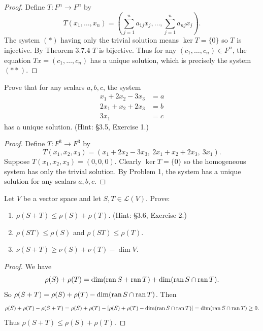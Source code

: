 \begin{proof}
    Define $T : F^n \to F^n$ by 
    \[T(x_1, \ldots, x_n) = \left(\sum_{j=1}^n a_{1j}x_j, \ldots, \sum_{j=1}^n a_{nj}x_j\right).\]
    The system $(*)$ having only the trivial solution means $\ker T = \{0\}$
        so $T$ is injective. 
    By Theorem 3.7.4 $T$ is bijective.
    Thus for any $(c_1, \ldots, c_n) \in F^n$, the equation $Tx = (c_1, \ldots, c_n)$ 
        has a unique solution, which is precisely the system $(**)$.
\end{proof}

\begin{tcolorbox}[title=Problem 2, breakable]
    Prove that for any scalars $a, b, c$, the system
    \begin{align*}
        x_1 + 2x_2 - 3x_3 &= a \\
        2x_1 + x_2 + 2x_3 &= b \\
        3x_1 \phantom{{}+ x_2} \phantom{{}- 3x_3} &= c
    \end{align*}
    has a unique solution. (Hint: \S 3.5, Exercise 1.)
\end{tcolorbox}

\begin{proof}
    Define $T : F^3 \to F^3$ by 
    \[T(x_1, x_2, x_3) = (x_1 + 2x_2 - 3x_3, \ 2x_1 + x_2 + 2x_3, \ 3x_1).\]
    Suppose $T(x_1, x_2, x_3) = (0, 0, 0)$. 
    Clearly $\ker T = \{0\}$ so the 
    homogeneous system has only the trivial solution. 
    By Problem 1, the system 
        has a unique solution for any scalars $a, b, c$.
\end{proof}


\begin{tcolorbox}[title=Problem 3, breakable]
    Let $V$ be a vector space and let $S, T \in \mathcal{L}(V)$. Prove:
    \begin{enumerate}
        \item[(i)] $\rho(S + T) \le \rho(S) + \rho(T)$. (Hint: \S 3.6, Exercise 2.)
        \item[(ii)] $\rho(ST) \le \rho(S)$ and $\rho(ST) \le \rho(T)$.
        \item[(iii)] $\nu(S + T) \ge \nu(S) + \nu(T) - \dim V$.
    \end{enumerate}
\end{tcolorbox}

\begin{proof}
    We have 
    \[\rho(S) + \rho(T) = \dim(\operatorname{ran} S + \operatorname{ran} T) + \dim(\operatorname{ran} S \cap \operatorname{ran} T).\]
    So $\rho(S + T) = \rho(S) + \rho(T) - \dim(\operatorname{ran} S \cap \operatorname{ran} T)$.
    Then 
    \[\rho(S) + \rho(T) - \rho(S + T) = \rho(S) + \rho(T) - [\rho(S) + \rho(T) - \dim(\operatorname{ran} S \cap \operatorname{ran} T)] = \dim(\operatorname{ran} S \cap \operatorname{ran} T) \ge 0.\]
    Thus $\rho(S + T) \le \rho(S) + \rho(T)$.
\end{proof}


